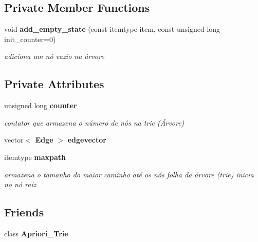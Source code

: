 \subsection*{Private Member Functions}
\begin{CompactItemize}
\item 
void {\bf add\_\-empty\_\-state} (const itemtype item, const unsigned long init\_\-counter=0)\label{classTrie_402abb731c04ad86f0cd9eeb54d84551}

\begin{CompactList}\small\item\em adiciona um nó vazio na árvore \item\end{CompactList}\end{CompactItemize}
\subsection*{Private Attributes}
\begin{CompactItemize}
\item 
unsigned long {\bf counter}\label{classTrie_2c605870a4e5975004e2e04a9a033d35}

\begin{CompactList}\small\item\em contator que armazena o número de nós na trie (Árvore) \item\end{CompactList}\item 
vector$<$ {\bf Edge} $>$ {\bf edgevector}
\item 
itemtype {\bf maxpath}\label{classTrie_ae77c1b5a29edfa8834f3c5bbadefcaa}

\begin{CompactList}\small\item\em armazena o tamanho do maior caminho até os nós folha da árvore (trie) inicia no nó raiz \item\end{CompactList}\end{CompactItemize}
\subsection*{Friends}
\begin{CompactItemize}
\item 
class {\bf Apriori\_\-Trie}\label{classTrie_a52b9f7760d9f17dbec03a4bc3e9408c}

\end{CompactItemize}


